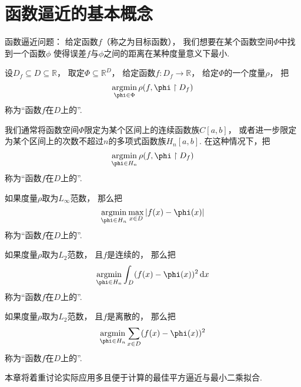 \section{函数逼近的基本概念}
函数逼近问题：
给定函数\(f\)（称之为目标函数），
我们想要在某个函数空间\(\Phi\)中找到一个函数\(\phi\)
使得误差\(f\)与\(\phi\)之间的距离在某种度量意义下最小.
\begin{definition}
设\(D_f \subseteq D \subseteq \mathbb{R}\)，
取定\(\Phi \subseteq \mathbb{R}^{D}\)，
给定函数\(f\colon D_f \to \mathbb{R}\)，
给定\(\Phi\)的一个度量\(\rho\)，
把\begin{equation*}
	\argmin_{\phi \in \Phi} \rho(f,\phi \SetRestrict D_f)
\end{equation*}
称为“函数\(f\)在\(D\)上的”.
\end{definition}

我们通常将函数空间\(\Phi\)限定为某个区间上的连续函数族\(C[a,b]\)，
或者进一步限定为某个区间上的次数不超过\(n\)的多项式函数族\(H_n[a,b]\).
在这种情况下，把\begin{equation*}
	\argmin_{\phi \in H_n} \rho(f,\phi \SetRestrict D_f)
\end{equation*}
称为“函数\(f\)在\(D\)上的”.

如果度量\(\rho\)取为\(L_\infty\)范数，
那么把\begin{equation*}
	\argmin_{\phi \in H_n} \max_{x \in D} \abs{f(x) - \phi(x)}
\end{equation*}
称为“函数\(f\)在\(D\)上的”.

如果度量\(\rho\)取为\(L_2\)范数，
且\(f\)是连续的，
那么把\begin{equation*}
	\argmin_{\phi \in H_n} \int_D (f(x) - \phi(x))^2 \dd{x}
\end{equation*}
称为“函数\(f\)在\(D\)上的”.

如果度量\(\rho\)取为\(L_2\)范数，
且\(f\)是离散的，
那么把\begin{equation*}
	\argmin_{\phi \in H_n} \sum_{x \in D} (f(x) - \phi(x))^2
\end{equation*}
称为“函数\(f\)在\(D\)上的”.

本章将着重讨论实际应用多且便于计算的最佳平方逼近与最小二乘拟合.

